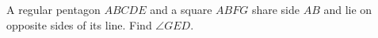 A regular pentagon $ABCDE$ and a square $ABFG$ share side $AB$ and lie on opposite sides of its line. Find $\angle GED$.
